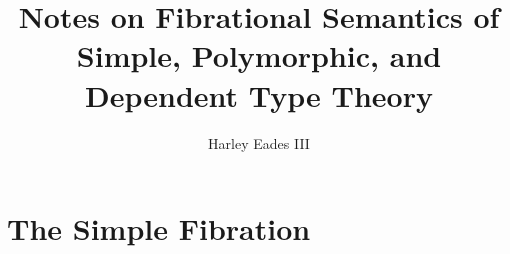 \documentclass{article}
\begin{document}
\title{Notes on Fibrational Semantics of Simple, Polymorphic, and Dependent Type Theory}
\author{Harley Eades III}
\maketitle

\section{The Simple Fibration}
\label{sec:the_simple_fibration}



\appendix


\end{document}
